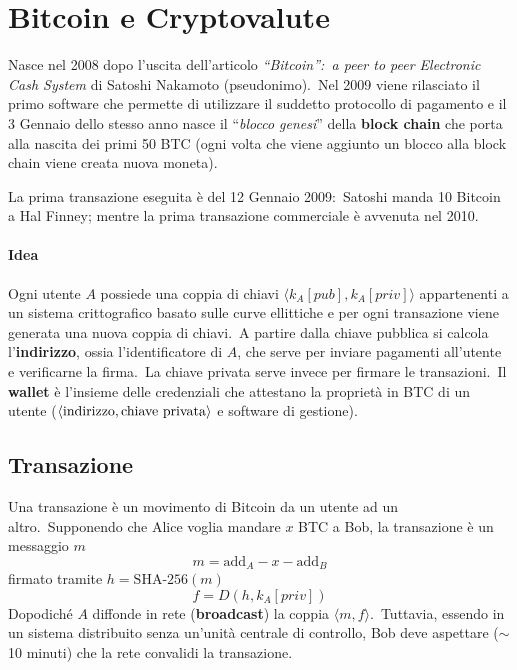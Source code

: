 \chapter{Bitcoin e Cryptovalute}

Nasce nel 2008 dopo l'uscita dell'articolo \textit{``Bitcoin'':\ a peer to peer Electronic Cash System} di Satoshi Nakamoto (pseudonimo).\
Nel 2009 viene rilasciato il primo software che permette di utilizzare il suddetto protocollo di pagamento e il 3 Gennaio dello stesso anno nasce il ``\textit{blocco genesi}'' della \textbf{block chain} che porta alla nascita dei primi 50 BTC (ogni volta che viene aggiunto un blocco alla block chain viene creata nuova moneta).

La prima transazione eseguita è del 12 Gennaio 2009:\ Satoshi manda 10 Bitcoin a Hal Finney; mentre la prima transazione commerciale è avvenuta nel 2010.\

\subsubsection{Idea}

Ogni utente $A$ possiede una coppia di chiavi $\langle k_A[\mathit{pub}], k_A[\mathit{priv}]\rangle$ appartenenti a un sistema crittografico basato sulle curve ellittiche e per ogni transazione viene generata una nuova coppia di chiavi.\
A partire dalla chiave pubblica si calcola l'\textbf{indirizzo}, ossia l'identificatore di $A$, che serve per inviare pagamenti all'utente e verificarne la firma.\
La chiave privata serve invece per firmare le transazioni.\
Il \textbf{wallet} è l'insieme delle credenziali che attestano la proprietà in BTC di un utente ($\langle \rm indirizzo, chiave\ privata\rangle$ e software di gestione).\

\section{Transazione}

Una transazione è un movimento di Bitcoin da un utente ad un altro.\
Supponendo che Alice voglia mandare $x$ BTC a Bob, la transazione è un messaggio $m$
\[ m = \mathrm{add}_A - x - \mathrm{add}_B\]
firmato tramite $h = \mathrm{SHA\textrm{-}256}(m)$
\[ f = D(h, k_A[\mathit{priv}]) \]
Dopodiché $A$ diffonde in rete (\textbf{broadcast}) la coppia $\langle m, f\rangle$.\
Tuttavia, essendo in un sistema distribuito senza un'unità centrale di controllo, Bob deve aspettare ($\sim$ 10 minuti) che la rete convalidi la transazione.\

